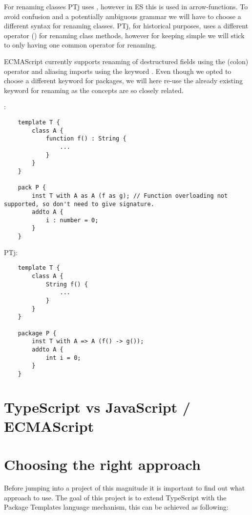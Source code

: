 For renaming classes PTj uses \codeword{=>}, however in ES this is used in arrow-functions\cite{arrowfunction}.
To avoid confusion and a potentially ambiguous grammar we will have to choose a different syntax for renaming classes.
PTj, for historical purposes, uses a different operator (\codeword{->}) for renaming class methods, however for keeping \plname{} simple we will stick to only having one common operator for renaming.

ECMAScript currently supports renaming of destructured fields using the \codeword{:}(colon) operator and aliasing imports using the keyword .
Even though we opted to choose a different keyword for packages, we will here re-use the already existing  keyword for renaming as the concepts are so closely related.

\plname{}:
\begin{lstlisting}
    template T {
        class A {
            function f() : String {
                ...
            }
        }
    }

    pack P {
        inst T with A as A (f as g); // Function overloading not supported, so don't need to give signature.
        addto A {
            i : number = 0;
        }
    }
\end{lstlisting}

PTj:
\begin{lstlisting}
    template T {
        class A {
            String f() {
                ...
            }
        }
    }

    package P {
        inst T with A => A (f() -> g()); 
        addto A {
            int i = 0;
        }
    }
\end{lstlisting}



\section{TypeScript vs JavaScript / ECMAScript}

\section{Choosing the right approach}\label{sec:choosing-the-right-approach}

Before jumping into a project of this magnitude it is important to find out what approach to use. 
The goal of this project is to extend TypeScript with the Package Templates language mechanism, this can be achieved as following:

